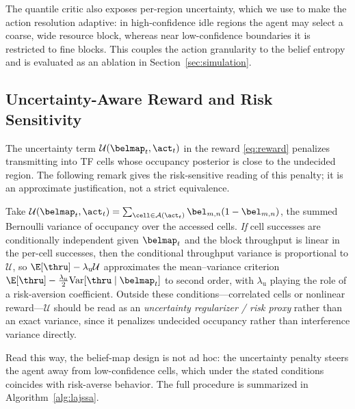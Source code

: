 \begin{remark}
\label{rem:m3}
The quantile critic also exposes per-region uncertainty, which we use to make
the action resolution adaptive: in high-confidence idle regions the agent may
select a coarse, wide resource block, whereas near low-confidence boundaries
it is restricted to fine blocks. This couples the action granularity to the
belief entropy and is evaluated as an ablation in
Section~\ref{sec:simulation}.
\end{remark}

\subsection{Uncertainty-Aware Reward and Risk Sensitivity}
\label{subsec:reward_shaping}
The uncertainty term $\mathcal{U}(\belmap_t,\act_t)$ in the reward
\eqref{eq:reward} penalizes transmitting into TF cells whose occupancy
posterior is close to the undecided region. The following remark gives the
risk-sensitive reading of this penalty; it is an approximate justification,
not a strict equivalence.

\begin{remark}
\label{prop:risk}
Take $\mathcal{U}(\belmap_t,\act_t)=\sum_{\cell\in\mathcal{A}(\act_t)}
\bel_{m,n}(1-\bel_{m,n})$, the summed Bernoulli variance of occupancy over
the accessed cells. \emph{If} cell successes are conditionally independent
given $\belmap_t$ and the block throughput is linear in the per-cell
successes, then the conditional throughput variance is proportional to
$\mathcal{U}$, so $\E[\thru]-\lambda_{\mathrm{u}}\mathcal{U}$ approximates the
mean--variance criterion
$\E[\thru]-\tfrac{\lambda_{\mathrm{u}}}{2}\mathrm{Var}[\thru\mid\belmap_t]$
to second order, with $\lambda_{\mathrm{u}}$ playing the role of a
risk-aversion coefficient. Outside these conditions---correlated cells or
nonlinear reward---$\mathcal{U}$ should be read as an \emph{uncertainty
regularizer / risk proxy} rather than an exact variance, since it penalizes
undecided occupancy rather than interference variance directly.
\end{remark}

\noindent Read this way, the belief-map design is not ad hoc: the
uncertainty penalty steers the agent away from low-confidence cells, which
under the stated conditions coincides with risk-averse behavior. The full
procedure is summarized in Algorithm~\ref{alg:lajssa}.

